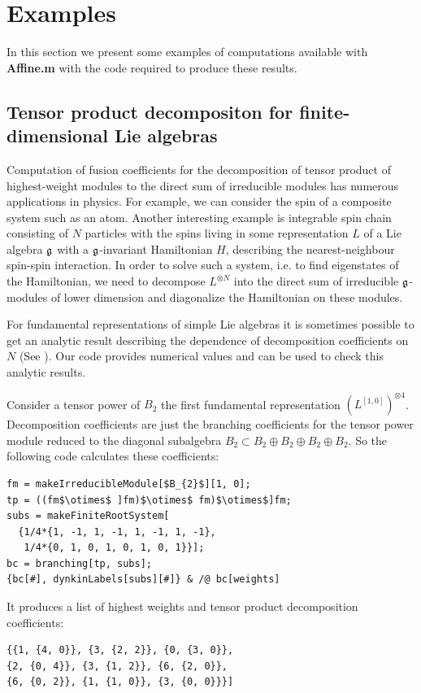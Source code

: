 \section{Examples}
\label{sec:examples}
In this section we present some examples of computations available with {\bf Affine.m} with the code required to produce these results.

\subsection{Tensor product decompositon for finite-dimensional Lie algebras}
\label{sec:tens-prod-decomp}

Computation of fusion coefficients for the decomposition of tensor product of highest-weight modules to the direct sum of irreducible modules has numerous applications in physics. For example, we can consider the spin of a composite system such as an atom. Another interesting example is integrable spin chain consisting of $N$ particles with the spins living in some representation $L$ of a Lie algebra $\mathfrak{g}$ with a $\mathfrak{g}$-invariant Hamiltonian $H$, describing the nearest-neighbour spin-spin interaction. In order to solve such a system, i.e. to find eigenstates of the Hamiltonian, we need to decompose $L^{\otimes N}$ into the direct sum of irreducible $\mathfrak{g}$-modules of lower dimension and diagonalize the Hamiltonian on these modules.

For fundamental representations of simple Lie algebras it is sometimes possible to get an analytic result describing the dependence of decomposition coefficients on $N$ (See \cite{LyakhovskyPostnova2011}). Our code provides numerical values and can be used to check this analytic results.

Consider a tensor power of $B_{2}$ the first fundamental representation $\left(L^{[1,0]}\right)^{\otimes 4}$. Decomposition coefficients are just the branching
 coefficients for the tensor power module reduced to the diagonal subalgebra $B_{2}\subset B_{2}\oplus B_{2}\oplus B_{2}\oplus B_{2}$. So the following code calculates these coefficients:
\begin{lstlisting}[mathescape=true]
fm = makeIrreducibleModule[$B_{2}$][1, 0];
tp = ((fm$\otimes$ ]fm)$\otimes$ fm)$\otimes$]fm;
subs = makeFiniteRootSystem[
  {1/4*{1, -1, 1, -1, 1, -1, 1, -1}, 
   1/4*{0, 1, 0, 1, 0, 1, 0, 1}}];
bc = branching[tp, subs];
{bc[#], dynkinLabels[subs][#]} & /@ bc[weights]
\end{lstlisting}
It produces a list of highest weights and tensor product decomposition coefficients:
\begin{lstlisting}
{{1, {4, 0}}, {3, {2, 2}}, {0, {3, 0}}, 
{2, {0, 4}}, {3, {1, 2}}, {6, {2, 0}}, 
{6, {0, 2}}, {1, {1, 0}}, {3, {0, 0}}}]
\end{lstlisting}

